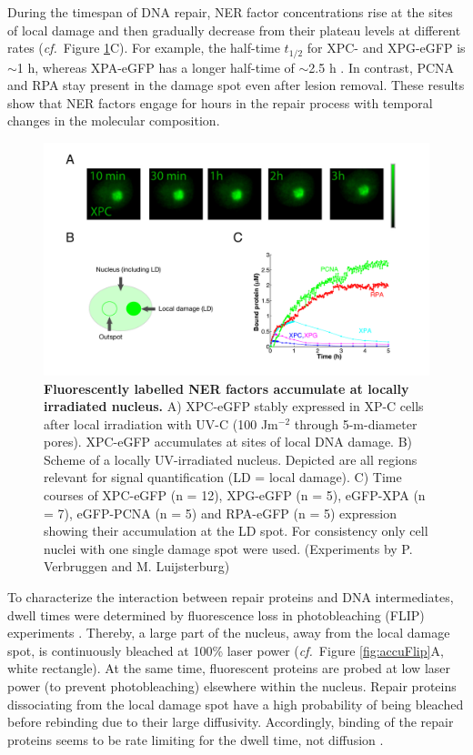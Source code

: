 During the timespan of DNA repair, NER factor concentrations rise at the sites of local damage and then gradually decrease from their plateau levels at different rates (\textit{cf.}\ Figure \ref{fig:accuImage}C). For example, the half-time $t_\text{1/2}$ for XPC- and XPG-eGFP is $\sim$1 h, whereas XPA-eGFP has a longer half-time of $\sim$2.5 h \cite{Luijsterburg2010}. In contrast, PCNA and RPA stay present in the damage spot even after lesion removal. These results show that NER factors engage for hours in the repair process with temporal changes in the molecular composition.\\
\begin{figure}[t!]
	\begin{center}
		\includegraphics[width=1\textwidth]{Abbildungen/figure2_2.pdf}
		\caption{\textbf{Fluorescently labelled NER factors accumulate at locally irradiated nucleus.} A) XPC-eGFP  stably expressed in XP-C cells  after local irradiation with UV-C (100 J$\text{m}^{-\text{2}}$ through 5-\textmu m-diameter pores). XPC-eGFP accumulates at sites of local DNA damage.  B) Scheme of a locally UV-irradiated nucleus. Depicted are all regions relevant for signal quantification (LD = local damage). C) Time courses of XPC-eGFP (n = 12), XPG-eGFP (n = 5), eGFP-XPA (n = 7), eGFP-PCNA (n = 5) and RPA-eGFP (n = 5) expression showing their accumulation at the LD spot. For consistency only cell nuclei with one single damage spot were used. (Experiments by P. Verbruggen and M. Luijsterburg)}
		\label{fig:accuImage}
	\end{center}
\end{figure}
To characterize the interaction between repair proteins and DNA intermediates, dwell times were determined by fluorescence loss in photobleaching (FLIP) experiments \cite{Luijsterburg2010}. Thereby, a large part of the nucleus, away from the local damage spot, is continuously bleached at 100\% laser power (\textit{cf.}\ Figure \ref{fig:accuFlip}A, white rectangle). At the same time, fluorescent proteins are probed at low laser power (to prevent photobleaching) elsewhere within the nucleus. Repair proteins dissociating from the local damage spot have a high probability of being bleached before rebinding due to their large diffusivity. Accordingly, binding of the repair proteins seems to be rate limiting for the dwell time, not diffusion \cite{Luijsterburg2010}.\\
